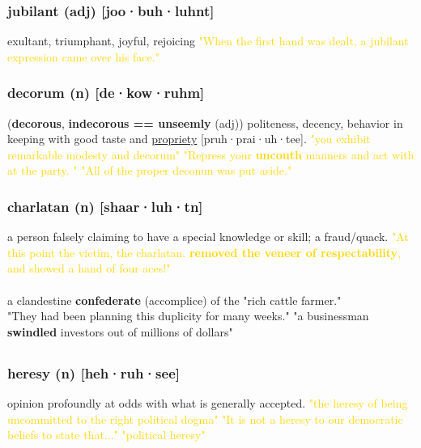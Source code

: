 \documentclass{proc}
\begin{document}
		\subsubsection{\textcolor{brickred}{jubilant} (adj) [joo·buh·luhnt]}
		exultant,
		triumphant,
		joyful,
		rejoicing
		\textcolor{gold}{"When the first hand was dealt, a jubilant 
		expression came over his face."}
		
		\subsubsection{\textcolor{brickred}{decorum} (n) [de·kow·ruhm]}
		(\textbf{decorous}, \textbf{indecorous == unseemly} (adj)) politeness, decency, behavior in keeping with good taste and \underline{propriety} [pruh·prai·uh·tee].
		\textcolor{gold}{"you exhibit remarkable modesty and decorum"
		"Repress your \textbf{uncouth} manners and act with at the party. "
		"All 
		of the proper deconun was put aside."}
		
		\subsubsection{\textcolor{brickred}{charlatan} (n) [shaar·luh·tn]}
		a person falsely claiming to have a special knowledge or skill; a fraud/quack.
		\textcolor{gold}{"At this point the victim, the 
		charlatan. \textbf{removed the veneer of respectability}, and showed a 
		hand of four aces!"}
		\\
		\\
		a clandestine \textbf{confederate} (accomplice) of the "rich cattle farmer."\\
		"They had 
		been planning this duplicity for many weeks."
		"a businessman \textbf{swindled} investors out of millions of dollars"

\newpage		
\setcounter{section}{31}
\setcounter{subsection}{0}

	\subsection{}
	\subsubsection{\textcolor{brickred}{heresy} (n) [heh·ruh·see]}
	opinion profoundly at odds with what is generally accepted.
	\textcolor{gold}{"the heresy of being uncommitted to the right political dogma"
	"It is not a heresy to our democratic beliefs to state that..."
	"political heresy"}
	
\end{document}
